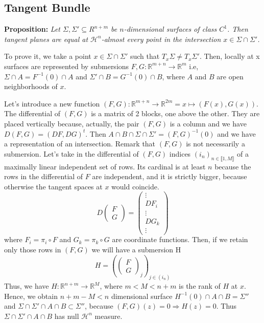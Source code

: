 \documentclass{article}
\begin{document}
\subsection{Tangent Bundle}
\clearpage
\textbf{Proposition:} \textit{Let $\Sigma, \Sigma′\subseteq R^{n+m}$ be
$n$-dimensional surfaces of class $C^1$. Then tangent planes are equal at 
$\mathcal H^n$-almost every point in the intersection $x∈\Sigma\cap\Sigma′$.}

\vspace{1ex}
To prove it, we take a point $x\in\Sigma\cap\Sigma'$ such that $T_x\Sigma\neq T_x
\Sigma'$. Then, locally at x surfaces are represented by submersions $F,G:\mathbb
R^{m+n}\rightarrow\mathbb R^m$ i.e, $\Sigma\cap A=F^{-1}(0)\cap A$ and
$\Sigma'\cap B=G^{-1}(0)\cap B$, where $A$ and $B$ are open neighborhoods of $x$.

\vspace{1ex}
Let's introduce a new function $(F, G):\mathbb R^{m+n}\rightarrow\mathbb R^{2m}
=x\mapsto (F(x),G(x))$. The differential of $(F,G)$ is a matrix of 2 blocks, one
above the other. They are placed vertically because, actually, the pair $(F,G)$ is
a column and we have $D(F,G)=(DF,DG)^t$. Then $A\cap B\cap\Sigma\cap\Sigma'=(F,G)
^{-1}(0)$ and we have a representation of an intersection. Remark
that $(F, G)$ is not necessarily a submersion. Let's take in the differential of $(F
,G)$ indices $(i_n)_{n\in\llbracket1,M\rrbracket}$ of a maximally linear
independent set of rows. Its cardinal is at least $n$ because the rows in the
differential of $F$ are independent, and it is strictly bigger, because otherwise
the tangent spaces at $x$ would coincide.
\[D\left(\begin{array}{cc} F\\ G\end{array}\right) =
    \left(\begin{array}{cc} \vdots \\DF_i\\ \vdots\\ DG_k\\ \vdots\end{array}\right)\]
where $F_i=\pi_i\circ F$ and $G_k=\pi_k\circ G$ are coordinate functions. Then,
if we retain only those rows in $(F,G)$ we will have a submersion H
\[H=\left(\left(\begin{array}{cc} F\\ G\end{array}\right)_j\right)_{j\in(i_n)}\]
Thus, we have $H:\mathbb R^{n+m}\rightarrow\mathbb R^{M}$, where $m<M<n+m$ is the
rank of $H$ at $x$. Hence, we obtain $n+m-M<n$ dimensional surface $H^{-1}(0)\cap
A\cap B=\Sigma''$ and $\Sigma\cap\Sigma'\cap A\cap B\subset\Sigma''$, because
$(F,G)(z)=0\Rightarrow H(z)=0$. Thus $\Sigma\cap\Sigma'\cap A\cap B$ has null
$\mathcal H^n$ measure.
\end{document}

